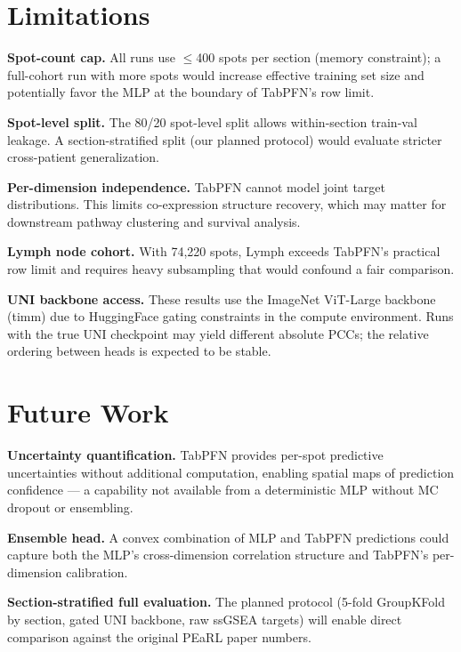 \documentclass[conference]{IEEEtran}
\begin{document}
\section{Limitations}
\label{sec:limitations}

\textbf{Spot-count cap.}
All runs use $\leq$400 spots per section (memory constraint); a full-cohort
run with more spots would increase effective training set size and potentially
favor the MLP at the boundary of TabPFN's row limit.

\textbf{Spot-level split.}
The 80/20 spot-level split allows within-section train-val leakage.
A section-stratified split (our planned protocol)
would evaluate stricter cross-patient generalization.

\textbf{Per-dimension independence.}
TabPFN cannot model joint target distributions.
This limits co-expression structure recovery, which may matter for downstream
pathway clustering and survival analysis.

\textbf{Lymph node cohort.}
With 74{,}220 spots, Lymph exceeds TabPFN's practical row limit and requires
heavy subsampling that would confound a fair comparison.

\textbf{UNI backbone access.}
These results use the ImageNet ViT-Large backbone (timm) due to HuggingFace
gating constraints in the compute environment.
Runs with the true UNI checkpoint may yield different absolute PCCs;
the relative ordering between heads is expected to be stable.

\section{Future Work}
\label{sec:future}

\textbf{Uncertainty quantification.}
TabPFN provides per-spot predictive uncertainties without additional computation,
enabling spatial maps of prediction confidence --- a capability not available
from a deterministic MLP without MC dropout or ensembling.

\textbf{Ensemble head.}
A convex combination of MLP and TabPFN predictions could capture both the MLP's
cross-dimension correlation structure and TabPFN's per-dimension calibration.

\textbf{Section-stratified full evaluation.}
The planned  protocol (5-fold GroupKFold by
section, gated UNI backbone, raw ssGSEA targets) will enable direct comparison
against the original PEaRL paper numbers.
\end{document}
